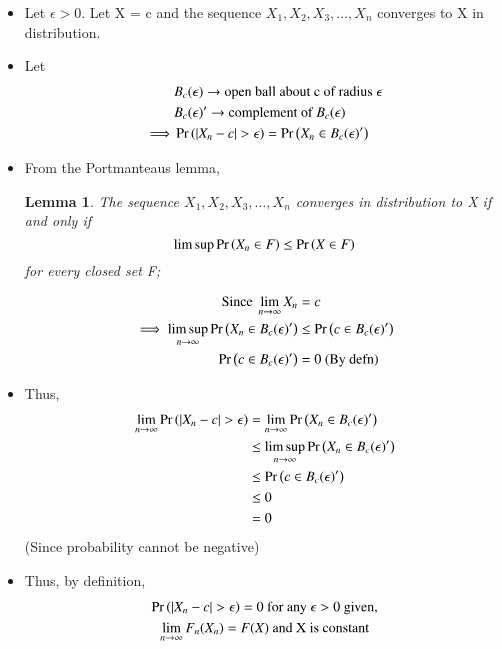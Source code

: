 \documentclass[journal,12pt,twocolumn]{IEEEtran}
\newtheorem{lemma}[theorem]{Lemma}
\begin{document}
    \begin{itemize}
        \item Let $\epsilon > 0$. Let X = c and the sequence $X_1,X_2,X_3, \dots ,X_n$ converges to X in distribution.
        \item Let \begin{align}
            &B_c( \epsilon ) \rightarrow \text{open ball about c of radius } \epsilon \\
            &B_c( \epsilon )' \rightarrow \text{complement of } B_c( \epsilon ) \\
            \implies &\pr{|X_n - c|>\epsilon} = \pr{X_ n\in B_c( \epsilon )'}
        \end{align}
        \item From the Portmanteaus lemma,\begin{lemma}
             The sequence $X_1,X_2,X_3, \dots ,X_n$ converges in distribution to X if and only if \begin{equation}
                  \limsup \Pr\left(X_{n}\in F\right) \leq \Pr\left(X \in F\right)
             \end{equation} for every closed set F;
        \end{lemma} 
        \begin{align}
           \text{Since }\lim_{n \rightarrow \infty}X_n &= c \\
            \implies \limsup_{n \rightarrow \infty} \Pr\left(X_n \in B_c( \epsilon )'\right) &\leq  \Pr\left(c \in B_c( \epsilon )'\right) \\
            \Pr\left(c \in B_c( \epsilon )'\right) &= 0 \text{ (By defn)}
        \end{align}
        \item Thus,
        \begin{align}
            \lim_{n \rightarrow \infty}\pr{|X_n - c|>\epsilon} &= \lim_{n \rightarrow \infty}\pr{X_n \in B_c( \epsilon )'} \\
            & \leq \limsup_{n \rightarrow \infty}\pr{X_n \in B_c( \epsilon )'} \\
            &\leq \pr{c \in B_c( \epsilon )'} \\
            &\leq 0 \\
            &= 0 
        \end{align}
        (Since probability cannot be negative)
        \item Thus, by definition,
        \begin{multline}
             \pr{|X_n-c|> \epsilon} = 0 \text{ for any }\epsilon > 0 \text{ given,} \\    
            \lim_{n \rightarrow \infty} F_n(X_n) = F(X)\text{ and X is constant}
        \end{multline}
    \end{itemize}
\end{document}

